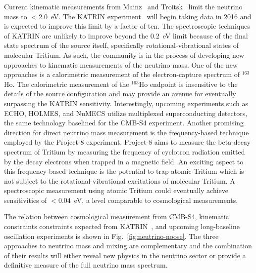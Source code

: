 Current kinematic measurements from Mainz~\cite{Mainz} and Troitsk~\cite{Troitsk} limit the neutrino mass to $< 2.0$~eV. The KATRIN experiment~\cite{angrik} will begin taking data in 2016 and is expected to improve this limit by a factor of ten. The spectroscopic techniques of KATRIN are unlikely to improve beyond the $0.2$~eV limit because of the final state spectrum of the source itself, specifically rotational-vibrational states of molecular Tritium. As such, the community is in the process of developing new approaches to kinematic measurements of the neutrino mass. One of the new approaches is a calorimetric measurement of the electron-capture spectrum of $^{163}$Ho. The calorimetric measurement of the $^{163}$Ho endpoint is insensitive to the details of the source configuration and may provide an avenue for eventually surpassing the KATRIN sensitivity. Interestingly, upcoming experiments such as ECHO, HOLMES, and NuMECS utilize multiplexed superconducting detectors, the same technology baselined for the CMB-S4 experiment. Another promising direction for direct neutrino mass measurement is the frequency-based technique employed by the Project-8 experiment. Project-8 aims to measure the beta-decay spectrum of Tritium by measuring the frequency of cyclotron radiation emitted by the decay electrons when trapped in a magnetic field. An exciting aspect to this frequency-based technique is the potential to trap atomic Tritium which is not subject to the rotational-vibrational excitations of molecular Tritium. A spectroscopic measurement using atomic Tritium could eventually achieve sensitivities of $<0.04$~eV, a level comparable to cosmological measurements.


The relation between cosmological measurement from CMB-S4, kinematic constraints constraints expected from KATRIN~\cite{}, and upcoming long-baseline oscillation experiments is shown in Fig.~\ref{fig:neutrino-noose}. The three approaches to neutrino mass and mixing are complementary and the combination of their results will either reveal new physics in the neutrino sector or provide a definitive measure of the full neutrino mass spectrum.

